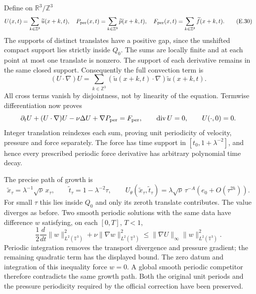 \documentclass[10pt,a4paper]{article}
\begin{document}
Define on $\mathbb R^3/\mathbb Z^3$
\[
 U(x,t)=\sum_{k\in\mathbb Z^3}\widetilde u(x+k,t),\quad
 P_{\rm per}(x,t)=\sum_{k\in\mathbb Z^3}\widetilde p(x+k,t),\quad
 F_{\rm per}(x,t)=\sum_{k\in\mathbb Z^3}\widetilde f(x+k,t).
 \tag{E.30}
\]
The supports of distinct translates have a positive gap, since
the unshifted compact support lies strictly inside $Q_0$.
The sums are locally finite and at each point at most one
translate is nonzero. The support of each derivative remains in
the same closed support. Consequently the full convection term is
\[
 (U\cdot\nabla)U
       =\sum_{k\in\mathbb Z^3}
             (\widetilde u(x+k,t)\cdot\nabla)\widetilde u(x+k,t).
\]
All cross terms vanish by disjointness, not by linearity of the
equation. Termwise differentiation now proves
\[
 \partial_tU+(U\cdot\nabla)U-\nu\Delta U+\nabla P_{\rm per}
        =F_{\rm per},\qquad
 \operatorname{div}U=0,\qquad U(\cdot,0)=0.
\]
Integer translation reindexes each sum, proving unit periodicity of
velocity, pressure and force separately. The force has time support
in $[t_0,1+\lambda^{-2}]$, and hence every prescribed periodic
force derivative has arbitrary polynomial time decay.

The precise path of growth is
\[
 \widetilde x_\tau=\lambda^{-1}\sqrt\nu\,x_\tau,\qquad
 \widetilde t_\tau=1-\lambda^{-2}\tau,\qquad
 U_\theta(\widetilde x_\tau,\widetilde t_\tau)
 =\lambda\sqrt\nu\,\tau^{-A}(e_0+O(\tau^{2h})).
\]
For small $\tau$ this lies inside $Q_0$ and only its zeroth
translate contributes. The value diverges as before.
Two smooth periodic solutions with the same data have difference
$w$ satisfying, on each $[0,T]$, $T<1$,
\[
 \frac12\frac{d}{dt}\|w\|_{L^2(\mathbb T^3)}^2
       +\nu\|\nabla w\|_{L^2(\mathbb T^3)}^2
 \le\|\nabla U\|_\infty\|w\|_{L^2(\mathbb T^3)}^2.
\]
Periodic integration removes the transport divergence and pressure
gradient; the remaining quadratic term has the displayed bound.
The zero datum and integration of this inequality force $w=0$.
A global smooth periodic competitor therefore contradicts the same
growth path. Both the original unit periods and the pressure
periodicity required by the official correction have been preserved.


\providecommand{\paHeat}{\mathcal H}
\providecommand{\paResidual}{\mathcal R}
\providecommand{\paReal}{\mathbb R}
\providecommand{\paSupport}{\operatorname{supp}}
\end{document}
